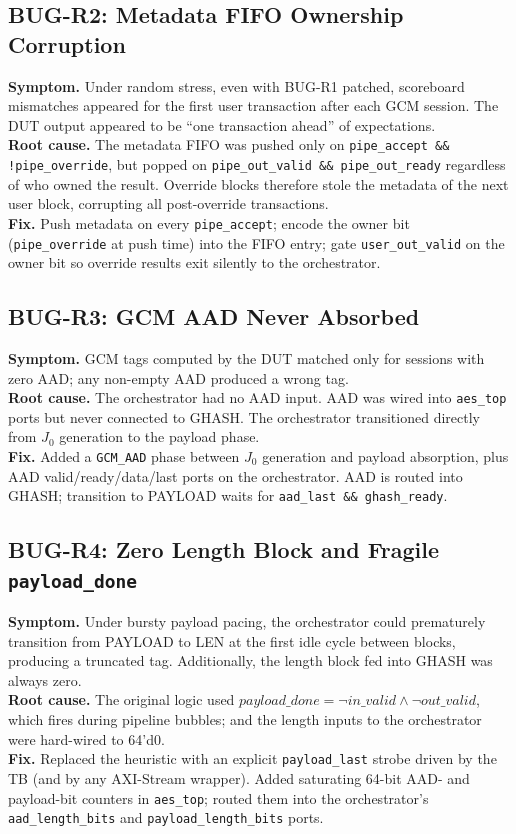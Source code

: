\documentclass[conference,10pt,a4paper]{IEEEtran}
\begin{document}
\subsection{BUG-R2: Metadata FIFO Ownership Corruption}
\textbf{Symptom.}  Under random stress, even with BUG-R1 patched,
scoreboard mismatches appeared for the first user transaction after
each GCM session.  The DUT output appeared to be ``one transaction
ahead'' of expectations.\\
\textbf{Root cause.}  The metadata FIFO was pushed only on
\texttt{pipe\_accept \&\& !pipe\_override}, but popped on
\texttt{pipe\_out\_valid \&\& pipe\_out\_ready} regardless of who owned
the result.  Override blocks therefore stole the metadata of the next
user block, corrupting all post-override transactions.\\
\textbf{Fix.}  Push metadata on every \texttt{pipe\_accept}; encode the
owner bit (\texttt{pipe\_override} at push time) into the FIFO entry;
gate \texttt{user\_out\_valid} on the owner bit so override results
exit silently to the orchestrator.

\subsection{BUG-R3: GCM AAD Never Absorbed}
\textbf{Symptom.}  GCM tags computed by the DUT matched only for sessions
with zero AAD; any non-empty AAD produced a wrong tag.\\
\textbf{Root cause.}  The orchestrator had no AAD input.  AAD was wired
into \texttt{aes\_top} ports but never connected to GHASH.  The
orchestrator transitioned directly from $J_0$ generation to the payload
phase.\\
\textbf{Fix.}  Added a \texttt{GCM\_AAD} phase between $J_0$ generation
and payload absorption, plus AAD valid/ready/data/last ports on the
orchestrator.  AAD is routed into GHASH; transition to PAYLOAD waits
for \texttt{aad\_last \&\& ghash\_ready}.

\subsection{BUG-R4: Zero Length Block and Fragile \texttt{payload\_done}}
\textbf{Symptom.}  Under bursty payload pacing, the orchestrator could
prematurely transition from PAYLOAD to LEN at the first idle cycle
between blocks, producing a truncated tag.  Additionally, the length
block fed into GHASH was always zero.\\
\textbf{Root cause.}  The original logic used
$\textit{payload\_done} = \lnot\textit{in\_valid}
\land\lnot\textit{out\_valid}$, which fires during pipeline bubbles;
and the length inputs to the orchestrator were hard-wired to 64'd0.\\
\textbf{Fix.}  Replaced the heuristic with an explicit
\texttt{payload\_last} strobe driven by the TB (and by any AXI-Stream
wrapper).  Added saturating 64-bit AAD- and payload-bit counters in
\texttt{aes\_top}; routed them into the orchestrator's
\texttt{aad\_length\_bits} and \texttt{payload\_length\_bits} ports.
\end{document}
